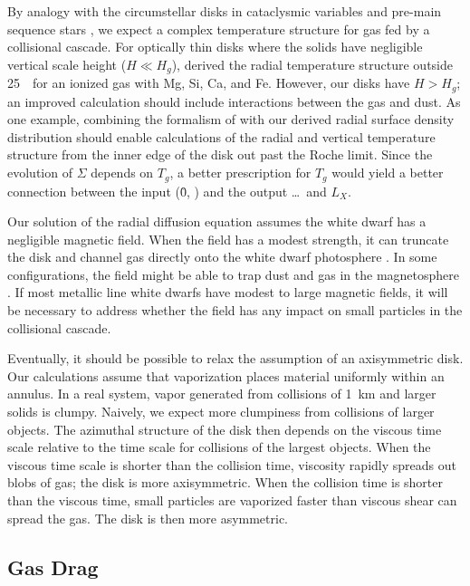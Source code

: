 \documentclass[12pt,preprint]{aastex}
\begin{document}
By analogy with the circumstellar disks in cataclysmic variables \citep{meyer1982,mineshige1983,
cannizzo1984} and pre-main sequence stars \citep{daless1998,najita2011,najita2013}, we expect 
a complex temperature structure for gas fed by a collisional cascade. For optically thin disks
where the solids have negligible vertical scale height ($H \ll H_g$), \citet{melis2010b} derived 
the radial temperature structure outside 25~\rstar\ for an ionized gas with Mg, Si, Ca, and Fe.  
However, our disks have $H > H_g$; an improved calculation should include interactions between 
the gas and dust. As one example, combining the formalism of \citet{najita2013} with our derived 
radial surface density distribution should enable calculations of the radial and vertical 
temperature structure from the inner edge of the disk out past the Roche limit. Since the 
evolution of $\Sigma$ depends on $T_g$, a better prescription for $T_g$ would yield a better 
connection between the input (\r0, \mdotz) and the output \mdots\ and $L_X$.

Our solution of the radial diffusion equation assumes the white dwarf has a negligible magnetic
field. When the field has a modest strength, it can truncate the disk and channel gas directly
onto the white dwarf photosphere \citep[e.g.,][and references therein]{ghosh1979,metzger2012,
mukai2017}. In some configurations, the field might be able to trap dust and gas in the 
magnetosphere \citep[e.g.,][]{farihi2017a}. If most metallic line white dwarfs have modest to
large magnetic fields, it will be necessary to address whether the field has any impact on 
small particles in the collisional cascade.

Eventually, it should be possible to relax the assumption of an axisymmetric disk. Our 
calculations assume that vaporization places material uniformly within an annulus. In a 
real system, vapor generated from collisions of 1~km and larger solids is clumpy. Naively, 
we expect more clumpiness from collisions of larger objects. The azimuthal structure of 
the disk then depends on the viscous time scale relative to the time scale for collisions
of the largest objects. When the viscous time scale is shorter than the collision time,
viscosity rapidly spreads out blobs of gas; the disk is more axisymmetric. When the 
collision time is shorter than the viscous time, small particles are vaporized faster than
viscous shear can spread the gas. The disk is then more asymmetric.

\subsection{Gas Drag}
\label{sec: disc-drag}
\end{document}
